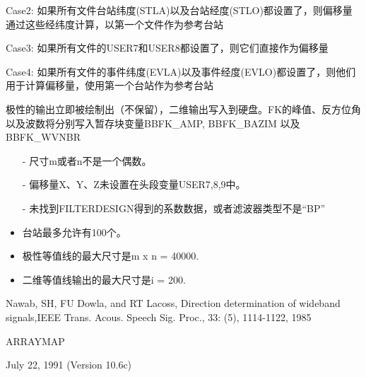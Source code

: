 Case2: 如果所有文件台站纬度(STLA)以及台站经度(STLO)都设置了，则偏移量通过这些经纬度计算，以第一个文件作为参考台站

Case3: 如果所有文件的USER7和USER8都设置了，则它们直接作为偏移量

Case4: 如果所有文件的事件纬度(EVLA)以及事件经度(EVLO)都设置了，则他们用于计算偏移量，使用第一个台站作为参考台站

极性的输出立即被绘制出（不保留），二维输出写入到硬盘。FK的峰值、反方位角以及波数将分别写入暂存块变量BBFK\_AMP, BBFK\_BAZIM 以及BBFK\_WVNBR

\begin{itemize}
\item[-]尺寸m或者n不是一个偶数。
\item[-]偏移量X、Y、Z未设置在头段变量USER7,8,9中。
\item[-]未找到FILTERDESIGN得到的系数数据，或者滤波器类型不是``BP''
\end{itemize}

\begin{itemize}
\item 台站最多允许有100个。
\item 极性等值线的最大尺寸是m x n = 40000.
\item 二维等值线输出的最大尺寸是i = 200.
\end{itemize}

Nawab, SH, FU Dowla, and RT Lacoss, Direction determination of wideband signals,IEEE Trans. Acous. Speech Sig. Proc., 33: (5), 1114-1122, 1985

ARRAYMAP

July 22, 1991 (Version 10.6c)
